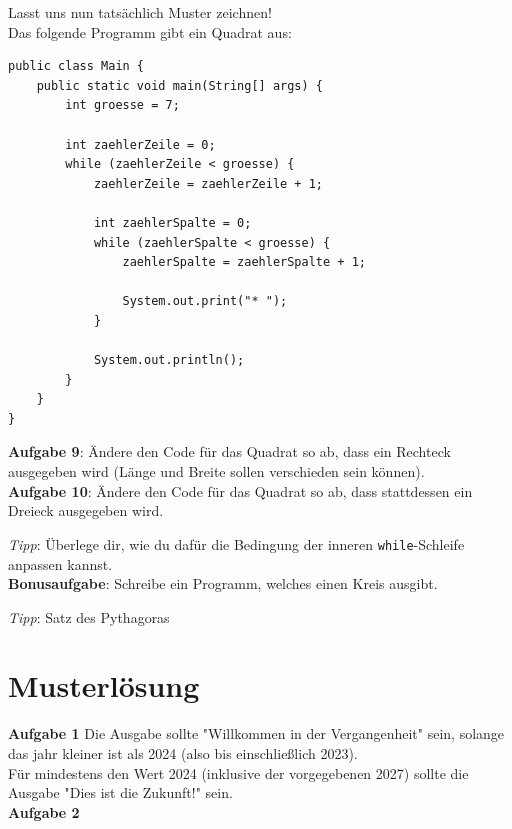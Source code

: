 \documentclass[ngerman,11pt]{article}
\begin{document}
    \vspace{1cm}

    Lasst uns nun tatsächlich Muster zeichnen! \\
    Das folgende Programm gibt ein Quadrat aus:

    \begin{lstlisting}[caption=\lstinline{Muster: Quadrat}, label={quadrat}]
public class Main {
    public static void main(String[] args) {
        int groesse = 7;

        int zaehlerZeile = 0;
        while (zaehlerZeile < groesse) {
            zaehlerZeile = zaehlerZeile + 1;

            int zaehlerSpalte = 0;
            while (zaehlerSpalte < groesse) {
                zaehlerSpalte = zaehlerSpalte + 1;

                System.out.print("* ");
            }

            System.out.println();
        }
    }
}
    \end{lstlisting}

    \textbf{Aufgabe 9}: Ändere den Code für das Quadrat so ab, dass ein Rechteck ausgegeben wird (Länge und Breite sollen verschieden sein können). \\

    \textbf{Aufgabe 10}: Ändere den Code für das Quadrat so ab, dass stattdessen ein Dreieck ausgegeben wird.

    \textit{Tipp}: Überlege dir, wie du dafür die Bedingung der inneren \lstinline{while}-Schleife anpassen kannst. \\

    \textbf{Bonusaufgabe}: Schreibe ein Programm, welches einen Kreis ausgibt.

    \textit{Tipp}: Satz des Pythagoras

    \newpage

    \section{Musterlösung}

    \textbf{Aufgabe 1} Die Ausgabe sollte "Willkommen in der Vergangenheit" sein, solange das jahr kleiner ist als 2024 (also bis einschließlich 2023). \\
    Für mindestens den Wert 2024 (inklusive der vorgegebenen 2027) sollte die Ausgabe "Dies ist die Zukunft!" sein. \\

    \textbf{Aufgabe 2}
\end{document}
